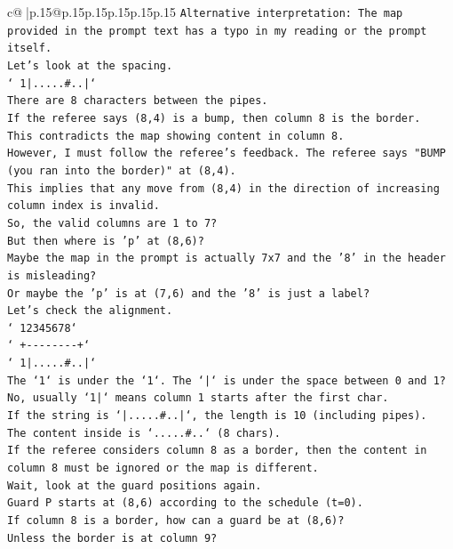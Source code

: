 \documentclass{article}
\begin{document}
{\begin{supertabular}{c@{$\;$}|p{.15\linewidth}@{}p{.15\linewidth}p{.15\linewidth}p{.15\linewidth}p{.15\linewidth}p{.15\linewidth}}
{{{\texttt{Alternative interpretation: The map provided in the prompt text has a typo in my reading or the prompt itself.} \\
\texttt{Let's look at the spacing.} \\
\texttt{` 1|.....\#..|`} \\
\texttt{There are 8 characters between the pipes.} \\
\texttt{If the referee says (8,4) is a bump, then column 8 is the border.} \\
\texttt{This contradicts the map showing content in column 8.} \\
\texttt{However, I must follow the referee's feedback. The referee says "BUMP (you ran into the border)" at (8,4).} \\
\texttt{This implies that any move from (8,4) in the direction of increasing column index is invalid.} \\
\texttt{So, the valid columns are 1 to 7?} \\
\texttt{But then where is 'p' at (8,6)?} \\
\texttt{Maybe the map in the prompt is actually 7x7 and the '8' in the header is misleading?} \\
\texttt{Or maybe the 'p' is at (7,6) and the '8' is just a label?} \\
\texttt{Let's check the alignment.} \\
\texttt{` 12345678`} \\
\texttt{`  +{-}{-}{-}{-}{-}{-}{-}{-}+`} \\
\texttt{` 1|.....\#..|`} \\
\texttt{The `1` is under the `1`. The `|` is under the space between 0 and 1? No, usually `1|` means column 1 starts after the first char.} \\
\texttt{If the string is `|.....\#..|`, the length is 10 (including pipes).} \\
\texttt{The content inside is `.....\#..` (8 chars).} \\
\texttt{If the referee considers column 8 as a border, then the content in column 8 must be ignored or the map is different.} \\
\texttt{Wait, look at the guard positions again.} \\
\texttt{Guard P starts at (8,6) according to the schedule (t=0).} \\
\texttt{If column 8 is a border, how can a guard be at (8,6)?} \\
\texttt{Unless the border is at column 9?} \\
}}}
\end{supertabular}}
\end{document}
